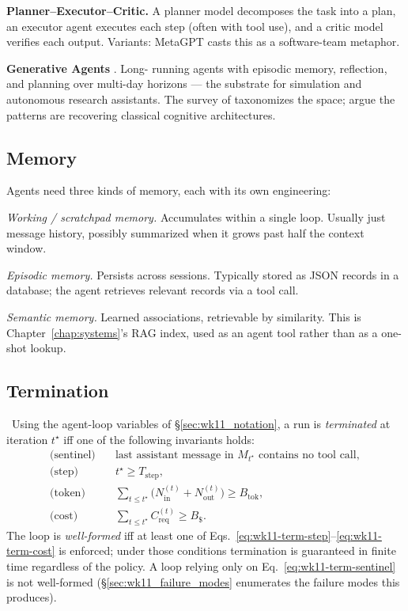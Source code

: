 \textbf{Planner--Executor--Critic.} A planner model decomposes
the task into a plan, an executor agent executes each step
(often with tool use), and a critic model verifies each output.
Variants: MetaGPT \citep{hong2024metagpt} casts this as a
software-team metaphor.

\textbf{Generative Agents} \citep{park2023generative}. Long-
running agents with episodic memory, reflection, and planning
over multi-day horizons --- the substrate for simulation and
autonomous research assistants. The survey of
\citet{wang2024agentsurvey} taxonomizes the space;
\citet{sumers2023cognitive} argue the patterns are recovering
classical cognitive architectures.

\subsection{Memory}

Agents need three kinds of memory, each with its own engineering:

\emph{Working / scratchpad memory.} Accumulates within a single
loop. Usually just message history, possibly summarized when it
grows past half the context window.

\emph{Episodic memory.} Persists across sessions. Typically
stored as JSON records in a database; the agent retrieves
relevant records via a tool call.

\emph{Semantic memory.} Learned associations, retrievable by
similarity. This is Chapter~\ref{chap:systems}'s RAG index, used as an agent tool
rather than as a one-shot lookup.

\subsection{Termination}
\label{sec:wk11_term}

\Def\ Using the agent-loop variables of
\S\ref{sec:wk11_notation}, a run is \emph{terminated} at iteration
$t^\star$ iff one of the following invariants holds:
\begin{align}
  \text{(sentinel)} \quad
      & \text{last assistant message in } M_{t^\star}
        \text{ contains no tool call},
      \label{eq:wk11-term-sentinel} \\
  \text{(step)} \quad
      & t^\star \ge T_\mathrm{step},
      \label{eq:wk11-term-step} \\
  \text{(token)} \quad
      & \sum_{t \le t^\star} \bigl(N_\mathrm{in}^{(t)} +
        N_\mathrm{out}^{(t)}\bigr) \ge B_\mathrm{tok},
      \label{eq:wk11-term-token} \\
  \text{(cost)} \quad
      & \sum_{t \le t^\star} C_\mathrm{req}^{(t)}
        \ge B_\${}.
      \label{eq:wk11-term-cost}
\end{align}
The loop is \emph{well-formed} iff at least one of
Eqs.~\eqref{eq:wk11-term-step}--\eqref{eq:wk11-term-cost} is
enforced; under those conditions termination is
guaranteed in finite time regardless of the policy. A loop relying
only on Eq.~\eqref{eq:wk11-term-sentinel} is not well-formed
(\S\ref{sec:wk11_failure_modes} enumerates the failure modes this
produces).

